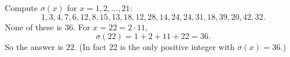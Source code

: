 Compute $\sigma(x)$ for $x=1,2,\dots,21$:
\[
1,3,4,7,6,12,8,15,13,18,12,28,14,24,24,31,18,39,20,42,32 .
\]
None of these is $36$. For $x=22=2\cdot11$,
\[
\sigma(22)=1+2+11+22=36 .
\]
So the answer is $\boxed{22}$. (In fact $22$ is the only positive integer with $\sigma(x)=36$.)
